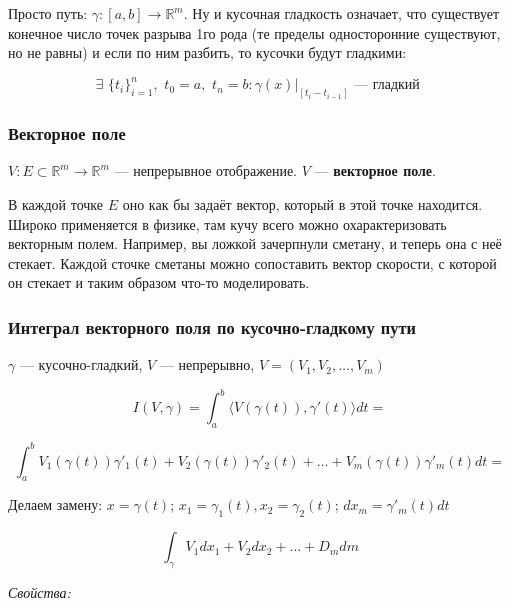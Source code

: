 \documentclass{article}
\def\dbl{\,\,}
\begin{document}
Просто путь: $\gamma: [a, b] \rightarrow \mathbb{R}^m$. Ну и кусочная гладкость означает, что существует конечное число точек разрыва 1го рода (те пределы односторонние существуют, но не равны) и если по ним разбить, то кусочки будут гладкими:

\[\exists \dbl \{t_i\}_{i = 1}^n, \dbl t_0 = a, \dbl t_n = b: \gamma(x)|_{[t_i - t_{i - 1}]} \text{ --- гладкий }\]

\subsubsection{Векторное поле}

$V: E \subset \mathbb{R}^m \rightarrow \mathbb{R}^m$ --- непрерывное отображение. $V$ --- \textbf{векторное поле}.

В каждой точке $E$ оно как бы задаёт вектор, который в этой точке находится. Широко применяется в физике, там кучу всего можно охарактеризовать векторным полем. Например, вы ложкой зачерпнули сметану, и теперь она с неё стекает. Каждой сточке сметаны можно сопоставить вектор скорости, с которой он стекает и таким образом что-то моделировать.


\subsubsection{Интеграл векторного поля по кусочно-гладкому пути}

$\gamma$ --- кусочно-гладкий, $V$ --- непрерывно, $V = (V_1, V_2, \ldots, V_m)$

\[I(V, \gamma) = \int_a^b\langle V\left(\gamma(t)\right), \gamma'(t)\rangle dt = \]

\[\int_a^b V_1\left(\gamma(t)\right)\gamma'_1(t) + V_2\left(\gamma(t)\right)\gamma'_2(t) + \ldots + V_m\left(\gamma(t)\right)\gamma'_m(t) dt =\]

Делаем замену: $x = \gamma(t)$; $x_1 = \gamma_1(t), x_2 = \gamma_2(t)$; $dx_m = \gamma'_m(t) dt$

\[\int_{\gamma} V_1 dx_1 + V_2 dx_2 + \ldots + D_m dm\]

\textit{Свойства:}
\end{document}
